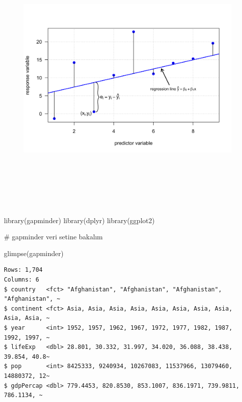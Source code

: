 \documentclass[
  letterpaper,
  DIV=11,
  numbers=noendperiod]{scrreprt}
\newenvironment{Shaded}{\begin{snugshade}}{\end{snugshade}}
\newcommand{\CommentTok}[1]{\textcolor[rgb]{0.37,0.37,0.37}{#1}}
\newcommand{\FunctionTok}[1]{\textcolor[rgb]{0.28,0.35,0.67}{#1}}
\newcommand{\NormalTok}[1]{\textcolor[rgb]{0.00,0.23,0.31}{#1}}
\begin{document}
\begin{figure}

{\centering \includegraphics[width=9.375in,height=5.4375in]{images/regresyon.png}

}

\end{figure}

\begin{Shaded}
\begin{Highlighting}[]
\FunctionTok{library}\NormalTok{(gapminder)}
\FunctionTok{library}\NormalTok{(dplyr)}
\FunctionTok{library}\NormalTok{(ggplot2)}

\CommentTok{\# gapminder veri setine bakalım}

\FunctionTok{glimpse}\NormalTok{(gapminder)}
\end{Highlighting}
\end{Shaded}

\begin{verbatim}
Rows: 1,704
Columns: 6
$ country   <fct> "Afghanistan", "Afghanistan", "Afghanistan", "Afghanistan", ~
$ continent <fct> Asia, Asia, Asia, Asia, Asia, Asia, Asia, Asia, Asia, Asia, ~
$ year      <int> 1952, 1957, 1962, 1967, 1972, 1977, 1982, 1987, 1992, 1997, ~
$ lifeExp   <dbl> 28.801, 30.332, 31.997, 34.020, 36.088, 38.438, 39.854, 40.8~
$ pop       <int> 8425333, 9240934, 10267083, 11537966, 13079460, 14880372, 12~
$ gdpPercap <dbl> 779.4453, 820.8530, 853.1007, 836.1971, 739.9811, 786.1134, ~
\end{verbatim}
\end{document}
